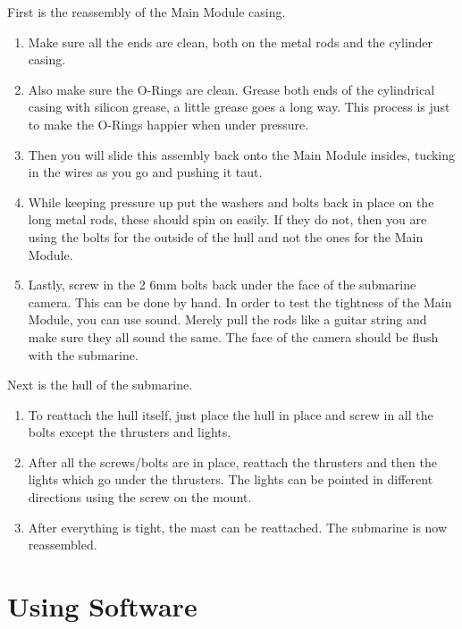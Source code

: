 \documentclass[
18pt, %
a4paper, %
oneside, %
headinclude,footinclude, %
]{scrartcl}
\begin{document}
First is the reassembly of the Main Module casing.
\begin{enumerate}
	\item  Make sure all the ends are clean, both on the metal rods and the cylinder casing. 
	\item Also make sure the O-Rings are clean. Grease both ends of the cylindrical casing with silicon grease, a little grease goes a long way. This process is just to make the O-Rings happier when under pressure. 
	\item Then you will slide this assembly back onto the Main Module insides, tucking in the wires as you go and pushing it taut. 
	\item While keeping pressure up put the washers and bolts back in place on the long metal rods, these should spin on easily. If they do not, then you are using the bolts for the outside of the hull and not the ones for the Main Module. 
	\item Lastly, screw in the 2 6mm bolts back under the face of the submarine camera. This can be done by hand. In order to test the tightness of the Main Module, you can use sound. Merely pull the rods like a guitar string and make sure they all sound the same. The face of the camera should be flush with the submarine.\\
\end{enumerate}

Next is the hull of the submarine.

\begin{enumerate}
	\item To reattach the hull itself, just place the hull in place and screw in all the bolts except the thrusters and lights. 
	\item After all the screws/bolts are in place, reattach the thrusters and then the lights which go under the thrusters. The lights can be pointed in different directions using the screw on the mount. 
	\item After everything is tight, the mast can be reattached. The submarine is now reassembled.
\end{enumerate}



\section{Using Software}
\end{document}
